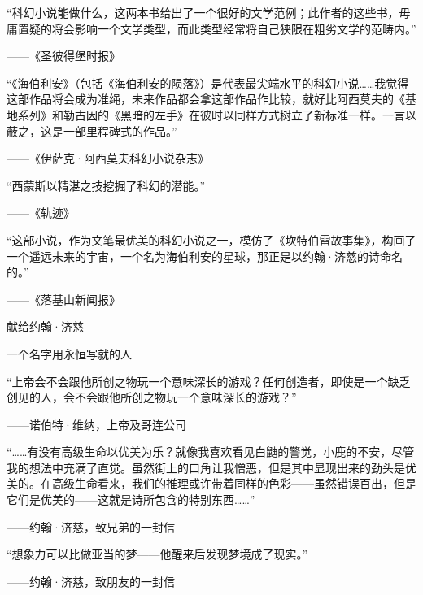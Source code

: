 \documentclass[AutoFakeBold=true]{book}
\begin{document}
``科幻小说能做什么，这两本书给出了一个很好的文学范例；此作者的这些书，毋庸置疑的将会影响一个文学类型，而此类型经常将自己狭限在粗劣文学的范畴内。''\begin{flushright}{\heiti ——《圣彼得堡时报》}\end{flushright}

``《海伯利安》（包括《海伯利安的陨落》）是代表最尖端水平的科幻小说……我觉得这部作品将会成为准绳，未来作品都会拿这部作品作比较，就好比阿西莫夫的《基地系列》和勒古因的《黑暗的左手》在彼时以同样方式树立了新标准一样。一言以蔽之，这是一部里程碑式的作品。''\begin{flushright}{\heiti ——《伊萨克·阿西莫夫科幻小说杂志》}\end{flushright}

``西蒙斯以精湛之技挖掘了科幻的潜能。''\begin{flushright}{\heiti ——《轨迹》}\end{flushright}

``这部小说，作为文笔最优美的科幻小说之一，模仿了《坎特伯雷故事集》，构画了一个遥远未来的宇宙，一个名为海伯利安的星球，那正是以约翰·济慈的诗命名的。''\begin{flushright}{\heiti ——《落基山新闻报》}\end{flushright}

\newpage
\vspace*{\fill}
\begin{center}
	献给约翰·济慈

	一个名字用永恒写就的人
\end{center}
\vspace*{\fill}

\newpage

``上帝会不会跟他所创之物玩一个意味深长的游戏？任何创造者，即使是一个缺乏创见的人，会不会跟他所创之物玩一个意味深长的游戏？''\begin{flushright}{\heiti ——诺伯特·维纳，上帝及哥连公司}\end{flushright}

``……有没有高级生命以优美为乐？就像我喜欢看见白鼬的警觉，小鹿的不安，尽管我的想法中充满了直觉。虽然街上的口角让我憎恶，但是其中显现出来的劲头是优美的。在高级生命看来，我们的推理或许带着同样的色彩——虽然错误百出，但是它们是优美的——这就是诗所包含的特别东西……''\begin{flushright}{\heiti ——约翰·济慈，致兄弟的一封信}\end{flushright}

``想象力可以比做亚当的梦——他醒来后发现梦境成了现实。''\begin{flushright}{\heiti ——约翰·济慈，致朋友的一封信}\end{flushright}
\end{document}
